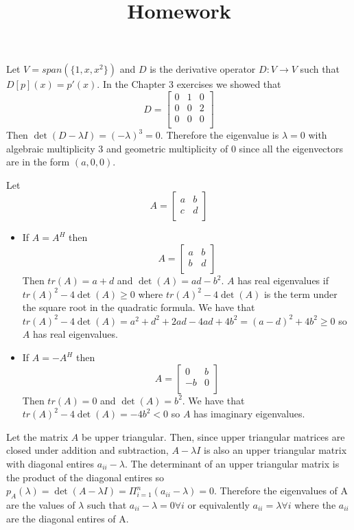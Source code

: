 \documentclass[12pt]{article}
\title{Homework}
\newenvironment{problem}[2][Problem]{\begin{trivlist}
\item[\hskip \labelsep {\bfseries #1}\hskip \labelsep {\bfseries #2}]}{\end{trivlist}}
\begin{document}
\begin{problem}{2.}
Let $V = span(\{1,x,x^2\})$ and $D$ is the derivative operator $D: V \to V$ such that $D[p](x) = p'(x)$. In the Chapter 3 exercises we showed that \[
   D=
  \left[ {\begin{array}{ccc}
   0 & 1 & 0\\
   0 & 0 & 2\\
   0 & 0 & 0\\
  \end{array} } \right]
\]
Then $\det(D - \lambda I) = (-\lambda)^3 = 0$. Therefore the eigenvalue is $\lambda = 0$ with algebraic multiplicity 3 and geometric multiplicity of 0 since all the eigenvectors are in the form $(a, 0, 0)$.
 \end{problem}

\begin{problem}{4.} 
Let   \[ A=
  \left[ {\begin{array}{ccc}
   a & b\\
   c & d\\
  \end{array} } \right]
\]

\begin{itemize}
\item [(i)] If $A = A^H$ then 
\[ A=
  \left[ {\begin{array}{ccc}
   a & b\\
   b & d\\
  \end{array} } \right]
\]
Then $tr(A) = a + d$ and $\det(A) = ad-b^2$. $A$ has real eigenvalues if $tr(A)^2 - 4\det(A) \geq 0$ where $tr(A)^2 - 4\det(A)$ is the term under the square root  in the quadratic formula. We have that $tr(A)^2 - 4\det(A) = a^2 + d^2 + 2ad - 4ad  + 4b^2 = (a -d)^2 + 4b^2  \geq 0$ so $A$ has real eigenvalues.
\item [(ii)] If $A = -A^H$ then 
\[ A=
  \left[ {\begin{array}{ccc}
   0 & b\\
   -b & 0\\
  \end{array} } \right]
\]
Then $tr(A) = 0$ and $\det(A) = b^2$. We have that $tr(A)^2 - 4\det(A) = -4b^2  < 0$ so $A$ has imaginary eigenvalues.
\end{itemize}
\end{problem}

\begin{problem}{6.} Let the matrix $A$ be upper triangular. Then, since upper triangular matrices are closed under addition and subtraction, $A-\lambda I$ is also an upper triangular matrix with diagonal entires $a_{ii} - \lambda$. The determinant of an upper triangular matrix is the product of the diagonal entires so $p_A(\lambda) = \det( A-\lambda I) = \Pi_{i=1}^n  (a_{ii} - \lambda) = 0$. Therefore the eigenvalues of A are the values of $\lambda$ such that $a_{ii} - \lambda = 0 \forall i$ or equivalently  $a_{ii} = \lambda  \forall i$ where the $a_{ii}$ are the diagonal entires of A. 
\end{problem}
\end{document}
